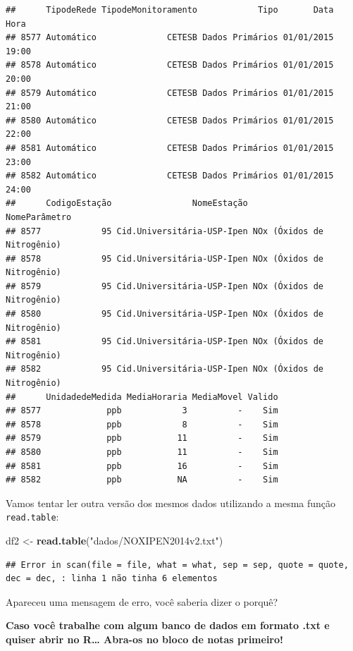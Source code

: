 \documentclass[]{book}
\newenvironment{Shaded}{\begin{snugshade}}{\end{snugshade}}
\newcommand{\KeywordTok}[1]{\textcolor[rgb]{0.13,0.29,0.53}{\textbf{#1}}}
\newcommand{\StringTok}[1]{\textcolor[rgb]{0.31,0.60,0.02}{#1}}
\newcommand{\NormalTok}[1]{#1}
\theoremstyle{definition}
\theoremstyle{definition}
\theoremstyle{definition}
\theoremstyle{remark}
\begin{document}
\begin{verbatim}
##      TipodeRede TipodeMonitoramento            Tipo       Data  Hora
## 8577 Automático              CETESB Dados Primários 01/01/2015 19:00
## 8578 Automático              CETESB Dados Primários 01/01/2015 20:00
## 8579 Automático              CETESB Dados Primários 01/01/2015 21:00
## 8580 Automático              CETESB Dados Primários 01/01/2015 22:00
## 8581 Automático              CETESB Dados Primários 01/01/2015 23:00
## 8582 Automático              CETESB Dados Primários 01/01/2015 24:00
##      CodigoEstação                NomeEstação              NomeParâmetro
## 8577            95 Cid.Universitária-USP-Ipen NOx (Óxidos de Nitrogênio)
## 8578            95 Cid.Universitária-USP-Ipen NOx (Óxidos de Nitrogênio)
## 8579            95 Cid.Universitária-USP-Ipen NOx (Óxidos de Nitrogênio)
## 8580            95 Cid.Universitária-USP-Ipen NOx (Óxidos de Nitrogênio)
## 8581            95 Cid.Universitária-USP-Ipen NOx (Óxidos de Nitrogênio)
## 8582            95 Cid.Universitária-USP-Ipen NOx (Óxidos de Nitrogênio)
##      UnidadedeMedida MediaHoraria MediaMovel Valido
## 8577             ppb            3          -    Sim
## 8578             ppb            8          -    Sim
## 8579             ppb           11          -    Sim
## 8580             ppb           11          -    Sim
## 8581             ppb           16          -    Sim
## 8582             ppb           NA          -    Sim
\end{verbatim}

Vamos tentar ler outra versão dos mesmos dados utilizando a mesma função
\texttt{read.table}:

\begin{Shaded}
\begin{Highlighting}[]
\NormalTok{df2 <-}\StringTok{ }\KeywordTok{read.table}\NormalTok{(}\StringTok{"dados/NOXIPEN2014v2.txt"}\NormalTok{)}
\end{Highlighting}
\end{Shaded}

\begin{verbatim}
## Error in scan(file = file, what = what, sep = sep, quote = quote, dec = dec, : linha 1 não tinha 6 elementos
\end{verbatim}

Apareceu uma mensagem de erro, {você saberia dizer o porquê?}

\textbf{Caso você trabalhe com algum banco de dados em formato .txt e
quiser abrir no R\ldots{} Abra-os no bloco de notas primeiro!}
\end{document}
